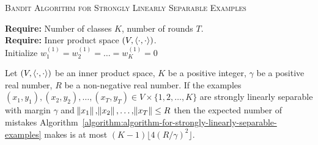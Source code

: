 \begin{algorithm}[h]
\SetAlgoLined
\LinesNumbered
\caption{\textsc{Bandit Algorithm for Strongly Linearly Separable Examples}
\label{algorithm:algorithm-for-strongly-linearly-separable-examples}}
\textbf{Require:} Number of classes $K$, number of rounds $T$. \\
\textbf{Require:} Inner product space $(V,\left\langle \cdot, \cdot \right\rangle)$.  \\
\nl Initialize $w_1^{(1)} = w_2^{(1)} = \dots = w_K^{(1)} = 0$\\ 
\nl {}

\end{algorithm}

\begin{theorem}
\label{theorem:strongly-separable-examples-mistake-upper-bound}
Let $(V, \left\langle \cdot, \cdot \right\rangle)$ be an inner product space, $K$ be a positive
integer, $\gamma$ be a positive real number, $R$ be a non-negative real number.
If the examples $(x_1, y_1), (x_2, y_2), \dots, (x_T, y_T) \in V \times
\{1,2,\dots,K\}$ are strongly linearly separable with margin $\gamma$ and 
$\norm{x_1}, \norm{x_2}, \dots, \norm{x_T} \le R$
then the expected number
of mistakes
Algorithm~\ref{algorithm:algorithm-for-strongly-linearly-separable-examples}
makes is at most $(K-1) \lfloor 4(R/\gamma)^2 \rfloor$.
\end{theorem}

